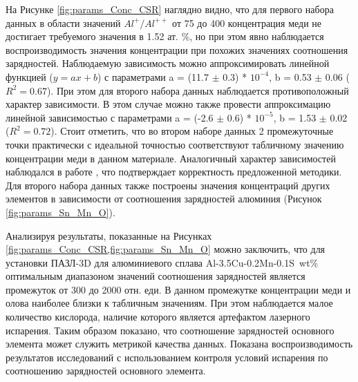 На Рисунке \cref{fig:params_Conc_CSR} наглядно видно, что для первого набора данных в области значений $Al^{+}/Al^{++}$ от 75 до 400 концентрация меди не достигает требуемого значения в 1.52 ат. \%, но при этом явно наблюдается воспроизводимость значения концентрации при похожих значениях соотношения зарядностей. Наблюдаемую зависимость можно аппроксимировать линейной функцией ($y = ax + b$) с параметрами a = (11.7 $\pm$ 0.3) * $10^{-4}$, b = 0.53 $\pm$ 0.06 ($R^{2} = 0.67$). При этом для второго набора данных наблюдается противоположный характер зависимости. В этом случае можно также провести аппроксимацию линейной зависимостью с параметрами a = (-2.6 $\pm$ 0.6) * $10^{-5}$, b = 1.53 $\pm$ 0.02 ($R^{2} = 0.72$). Стоит отметить, что во втором наборе данных 2 промежуточные точки практически с идеальной точностью соответствуют табличному значению концентрации меди в данном материале. Аналогичный характер зависимостей наблюдался в работе \cite{Mancini14}, что подтверждает корректность предложенной методики. Для второго набора данных также построены значения концентраций других элементов  в зависимости от соотношения зарядностей алюминия (Рисунок \cref{fig:params_Sn_Mn_O}).


Анализируя результаты, показанные на Рисунках \cref{fig:params_Conc_CSR,fig:params_Sn_Mn_O} можно заключить, что для установки ПАЗЛ-3D для алюминиевого сплава Al-3.5Cu-0.2Mn-0.1S~wt\% оптимальным диапазоном значений соотношения зарядностей является промежуток от 300 до 2000 отн. еди. В данном промежутке концентрации меди и олова наиболее близки к табличным значениям. При этом наблюдается малое количество кислорода, наличие которого является артефактом лазерного испарения. Таким образом показано, что соотношение зарядностей основного элемента может служить метрикой качества данных. Показана воспроизводимость результатов исследований с использованием контроля условий испарения по соотношению зарядностей основного элемента.

